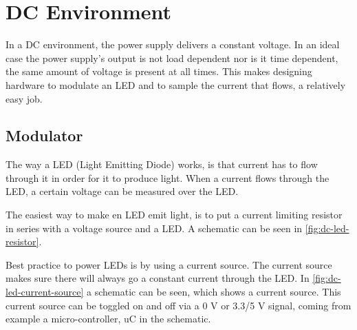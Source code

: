 
\section{DC Environment}
\label{sec:dc-environment}

In a DC environment, the power supply delivers a constant voltage.
In an ideal case the power supply's output is not load dependent nor is it time dependent, the same amount of voltage is present at all times.
This makes designing hardware to modulate an LED and to sample the current that flows, a relatively easy job.

\subsection{Modulator}

The way a LED (Light Emitting Diode) works, is that current has to flow through it in order for it to produce light.
When a current flows through the LED, a certain voltage can be measured over the LED.

The easiest way to make en LED emit light, is to put a current limiting resistor in series with a voltage source and a LED.
A schematic can be seen in \autoref{fig:dc-led-resistor}.

Best practice to power LEDs is by using a current source. 
The current source makes sure there will always go a constant current through the LED.
In \autoref{fig:dc-led-current-source} a schematic can be seen, which shows a current source.
This current source can be toggled on and off via a 0 V or 3.3/5 V signal, coming from example a micro-controller, uC in the schematic.


